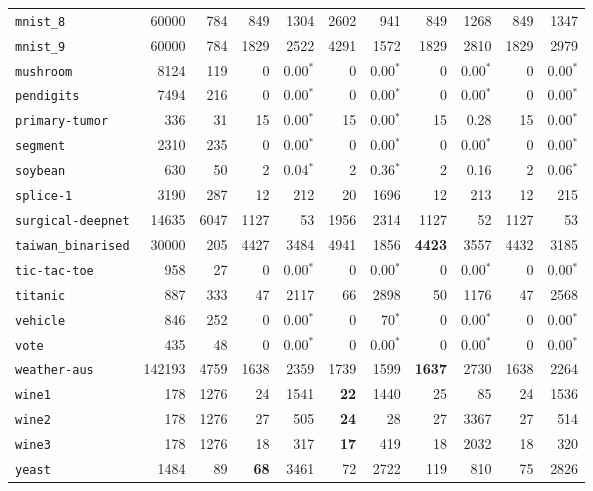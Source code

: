 \begin{tabular}{lccrrrrrrrr}
\texttt{mnist\_8} & \multicolumn{1}{r}{60000} & \multicolumn{1}{r}{784}  & 849 & 1304 & 2602 & 941 & 849 & 1268 & 849 & 1347\\
\texttt{mnist\_9} & \multicolumn{1}{r}{60000} & \multicolumn{1}{r}{784}  & 1829 & 2522 & 4291 & 1572 & 1829 & 2810 & 1829 & 2979\\
\texttt{mushroom} & \multicolumn{1}{r}{8124} & \multicolumn{1}{r}{119}  & 0 & 0.00$^*$ & 0 & 0.00$^*$ & 0 & 0.00$^*$ & 0 & 0.00$^*$\\
\texttt{pendigits} & \multicolumn{1}{r}{7494} & \multicolumn{1}{r}{216}  & 0 & 0.00$^*$ & 0 & 0.00$^*$ & 0 & 0.00$^*$ & 0 & 0.00$^*$\\
\texttt{primary-tumor} & \multicolumn{1}{r}{336} & \multicolumn{1}{r}{31}  & 15 & 0.00$^*$ & 15 & 0.00$^*$ & 15 & 0.28 & 15 & 0.00$^*$\\
\texttt{segment} & \multicolumn{1}{r}{2310} & \multicolumn{1}{r}{235}  & 0 & 0.00$^*$ & 0 & 0.00$^*$ & 0 & 0.00$^*$ & 0 & 0.00$^*$\\
\texttt{soybean} & \multicolumn{1}{r}{630} & \multicolumn{1}{r}{50}  & 2 & 0.04$^*$ & 2 & 0.36$^*$ & 2 & 0.16 & 2 & 0.06$^*$\\
\texttt{splice-1} & \multicolumn{1}{r}{3190} & \multicolumn{1}{r}{287}  & 12 & 212 & 20 & 1696 & 12 & 213 & 12 & 215\\
\texttt{surgical-deepnet} & \multicolumn{1}{r}{14635} & \multicolumn{1}{r}{6047}  & 1127 & 53 & 1956 & 2314 & 1127 & 52 & 1127 & 53\\
\texttt{taiwan\_binarised} & \multicolumn{1}{r}{30000} & \multicolumn{1}{r}{205}  & 4427 & 3484 & 4941 & 1856 & \textbf{4423} & 3557 & 4432 & 3185\\
\texttt{tic-tac-toe} & \multicolumn{1}{r}{958} & \multicolumn{1}{r}{27}  & 0 & 0.00$^*$ & 0 & 0.00$^*$ & 0 & 0.00$^*$ & 0 & 0.00$^*$\\
\texttt{titanic} & \multicolumn{1}{r}{887} & \multicolumn{1}{r}{333}  & 47 & 2117 & 66 & 2898 & 50 & 1176 & 47 & 2568\\
\texttt{vehicle} & \multicolumn{1}{r}{846} & \multicolumn{1}{r}{252}  & 0 & 0.00$^*$ & 0 & 70$^*$ & 0 & 0.00$^*$ & 0 & 0.00$^*$\\
\texttt{vote} & \multicolumn{1}{r}{435} & \multicolumn{1}{r}{48}  & 0 & 0.00$^*$ & 0 & 0.00$^*$ & 0 & 0.00$^*$ & 0 & 0.00$^*$\\
\texttt{weather-aus} & \multicolumn{1}{r}{142193} & \multicolumn{1}{r}{4759}  & 1638 & 2359 & 1739 & 1599 & \textbf{1637} & 2730 & 1638 & 2264\\
\texttt{wine1} & \multicolumn{1}{r}{178} & \multicolumn{1}{r}{1276}  & 24 & 1541 & \textbf{22} & 1440 & 25 & 85 & 24 & 1536\\
\texttt{wine2} & \multicolumn{1}{r}{178} & \multicolumn{1}{r}{1276}  & 27 & 505 & \textbf{24} & 28 & 27 & 3367 & 27 & 514\\
\texttt{wine3} & \multicolumn{1}{r}{178} & \multicolumn{1}{r}{1276}  & 18 & 317 & \textbf{17} & 419 & 18 & 2032 & 18 & 320\\
\texttt{yeast} & \multicolumn{1}{r}{1484} & \multicolumn{1}{r}{89}  & \textbf{68} & 3461 & 72 & 2722 & 119 & 810 & 75 & 2826\\
\bottomrule
\end{tabular}
